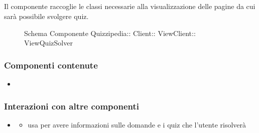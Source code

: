 \subsection{}
Il componente raccoglie le classi necessarie alla visualizzazione delle pagine da cui sarà possibile svolgere quiz.
\begin{figure}[H]
\centering
\noindent{}
\caption[Schema Componente ViewQuizSolver]{Schema Componente Quizzipedia:: Client:: ViewClient:: ViewQuizSolver}
\end{figure}
\subsubsection{Componenti contenute}
\begin{itemize}
\item {}
\end{itemize}
\subsubsection{Interazioni con altre componenti}
\begin{itemize}
\item {}
\begin{itemize}
\item usa  per avere informazioni sulle domande e i quiz che l'utente risolverà
\end{itemize}
\end{itemize}
